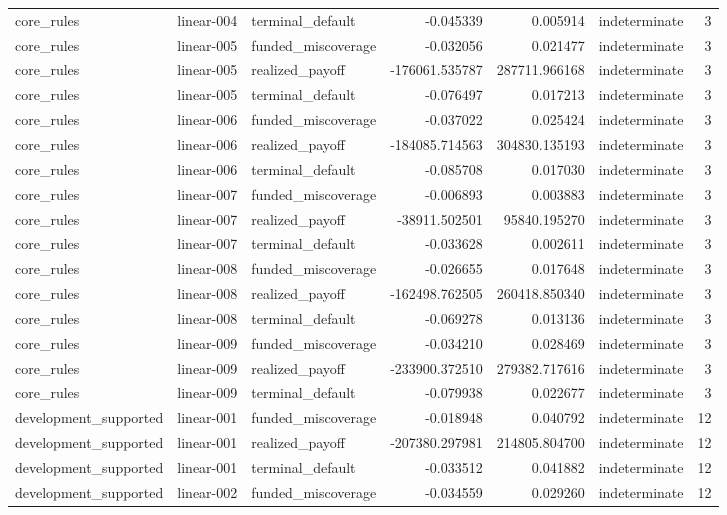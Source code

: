 \begin{tabular}{lllrrlr}
core\_rules & linear-004 & terminal\_default & -0.045339 & 0.005914 & indeterminate & 3 \\
core\_rules & linear-005 & funded\_miscoverage & -0.032056 & 0.021477 & indeterminate & 3 \\
core\_rules & linear-005 & realized\_payoff & -176061.535787 & 287711.966168 & indeterminate & 3 \\
core\_rules & linear-005 & terminal\_default & -0.076497 & 0.017213 & indeterminate & 3 \\
core\_rules & linear-006 & funded\_miscoverage & -0.037022 & 0.025424 & indeterminate & 3 \\
core\_rules & linear-006 & realized\_payoff & -184085.714563 & 304830.135193 & indeterminate & 3 \\
core\_rules & linear-006 & terminal\_default & -0.085708 & 0.017030 & indeterminate & 3 \\
core\_rules & linear-007 & funded\_miscoverage & -0.006893 & 0.003883 & indeterminate & 3 \\
core\_rules & linear-007 & realized\_payoff & -38911.502501 & 95840.195270 & indeterminate & 3 \\
core\_rules & linear-007 & terminal\_default & -0.033628 & 0.002611 & indeterminate & 3 \\
core\_rules & linear-008 & funded\_miscoverage & -0.026655 & 0.017648 & indeterminate & 3 \\
core\_rules & linear-008 & realized\_payoff & -162498.762505 & 260418.850340 & indeterminate & 3 \\
core\_rules & linear-008 & terminal\_default & -0.069278 & 0.013136 & indeterminate & 3 \\
core\_rules & linear-009 & funded\_miscoverage & -0.034210 & 0.028469 & indeterminate & 3 \\
core\_rules & linear-009 & realized\_payoff & -233900.372510 & 279382.717616 & indeterminate & 3 \\
core\_rules & linear-009 & terminal\_default & -0.079938 & 0.022677 & indeterminate & 3 \\
development\_supported & linear-001 & funded\_miscoverage & -0.018948 & 0.040792 & indeterminate & 12 \\
development\_supported & linear-001 & realized\_payoff & -207380.297981 & 214805.804700 & indeterminate & 12 \\
development\_supported & linear-001 & terminal\_default & -0.033512 & 0.041882 & indeterminate & 12 \\
development\_supported & linear-002 & funded\_miscoverage & -0.034559 & 0.029260 & indeterminate & 12 \\

\end{tabular}
